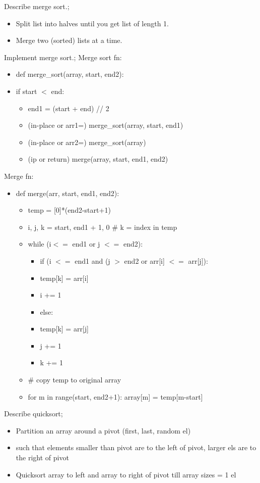 \documentclass{article}
\begin{document}
Describe merge sort.; \begin{itemize} \item Split list into halves until you get list of length 1. \item Merge two (sorted) lists at a time. \end{itemize}

Implement merge sort.; Merge sort fn: \begin{itemize} \item def merge\_sort(array, start, end2): \item if start $<$ end: \begin{itemize} \item 	end1 = (start + end) // 2 \item (in-place or arr1=) merge\_sort(array, start, end1) \item (in-place or arr2=) merge\_sort(array) \item (ip or return) merge(array, start, end1, end2) \end{itemize} \end{itemize} Merge fn: \begin{itemize} \item def merge(arr, start, end1, end2): \begin{itemize} \item temp = [0]*(end2-start+1) \item i, j, k = start, end1 + 1, 0 \# k = index in temp \item  while (i$<=$ end1 or j $<=$ end2): \begin{itemize} \item if (i $<=$ end1 and (j $>$ end2 or arr[i] $<=$ arr[j]): \item temp[k] = arr[i] \item i += 1 \item else: \item temp[k] = arr[j] \item j += 1 \item k += 1 \end{itemize} \item \# copy temp to original array \item for m in range(start, end2+1): array[m] = temp[m-start] \end{itemize} \end{itemize}

Describe quicksort; \begin{itemize} \item Partition an array around a pivot (first, last, random el) \item such that elements smaller than pivot are to the left of pivot, larger els are to the right of pivot \item Quicksort array to left and array to right of pivot till array sizes = 1 el \end{itemize}
\end{document}
